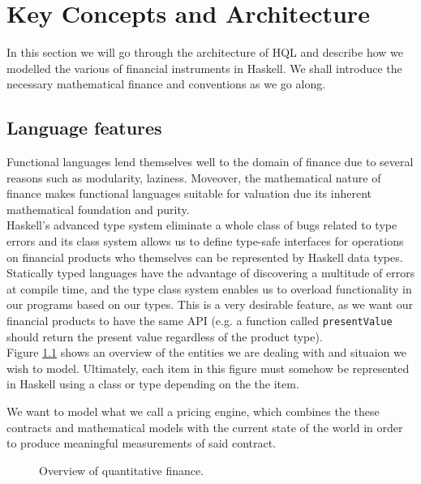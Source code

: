 \chapter{Key Concepts and Architecture}

In this section we will go through the architecture of HQL and describe how we
modelled the various of financial instruments in Haskell. We shall introduce
the necessary mathematical finance and conventions as we go along.

\section{Language features}

Functional languages lend themselves well to the domain of finance due
to several reasons such as modularity\cite{hughes:matters-cj}, 
laziness\cite{composingcontracts}. Moveover, the mathematical
 nature of finance makes functional languages suitable for valuation due its
inherent mathematical foundation and purity.\\

Haskell's advanced type system eliminate a whole class of bugs related to 
type errors and its 
class system allows us to define type-safe interfaces for operations on 
financial products who themselves can be represented by Haskell data types. 
Statically typed languages have the advantage of discovering a multitude of
errors at compile time, and the type class system enables us to overload 
functionality in our programs based on our types. This is a very desirable
feature, as we want our financial products to have the same API (e.g. a function 
called \texttt{presentValue} should return the present value regardless of the
product type).\\

Figure \ref{fig:overview} shows an overview of the entities we are dealing with
and situaion we wish to model. Ultimately, each item in this figure must somehow
be represented in Haskell using a class or type depending on the the item.

We want to model what we call a pricing engine, which combines the 
these contracts and mathematical models with the current state of the world
in order to produce meaningful measurements of said contract.\\

\begin{figure}[!htb]
\centering
\caption{Overview of quantitative finance.}
\label{fig:overview}
\end{figure}

